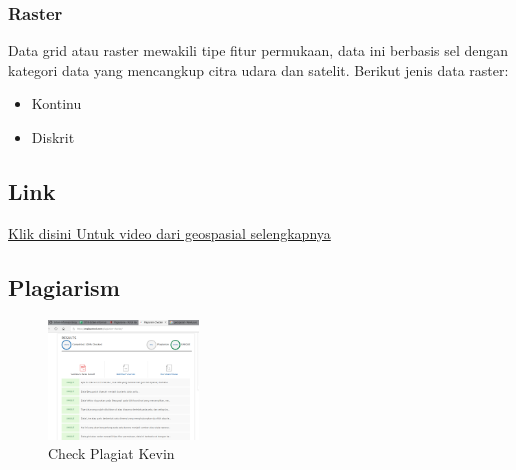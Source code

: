 \subsubsection{Raster}
Data grid atau raster mewakili tipe fitur permukaan, data ini berbasis sel dengan kategori data yang mencangkup citra udara dan satelit. Berikut jenis data raster:
\begin {itemize}
	\item Kontinu
	\item Diskrit
\end {itemize}

 
\subsection{Link}
\href{https://www.youtube.com/watch?v=gFEpzbs1_04}{Klik disini Untuk video dari geospasial selengkapnya}
\subsection{Plagiarism}
\begin{figure}[H]
	\includegraphics[width=4cm]{figures/1174059/plagiarisme.png}
	\centering
	\caption{Check Plagiat Kevin}
\end{figure}


